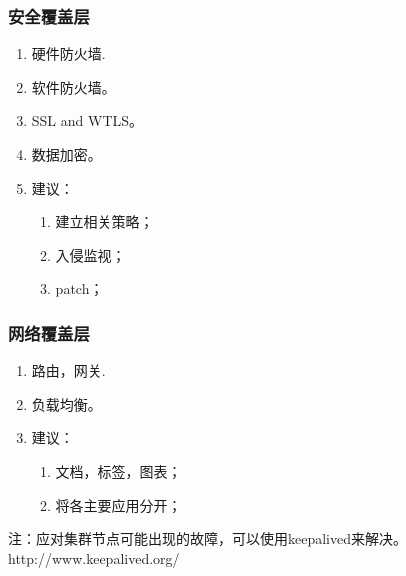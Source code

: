 \subsubsection{安全覆盖层}
\begin{enumerate}
   \item 硬件防火墙.
   \item 软件防火墙。
   \item SSL and WTLS。   
   \item 数据加密。   
   \item 建议：
       \begin{enumerate}[label=(\arabic*)]      
       \item 建立相关策略；
       \item 入侵监视；
       \item patch；
     \end{enumerate}
\end{enumerate}

\subsubsection{网络覆盖层}
\begin{enumerate}
   \item 路由，网关.
   \item 负载均衡。
   \item 建议：
       \begin{enumerate}[label=(\arabic*)]      
       \item 文档，标签，图表；
       \item 将各主要应用分开；
     \end{enumerate}
\end{enumerate}

\par 注：应对集群节点可能出现的故障，可以使用keepalived来解决。http://www.keepalived.org/

